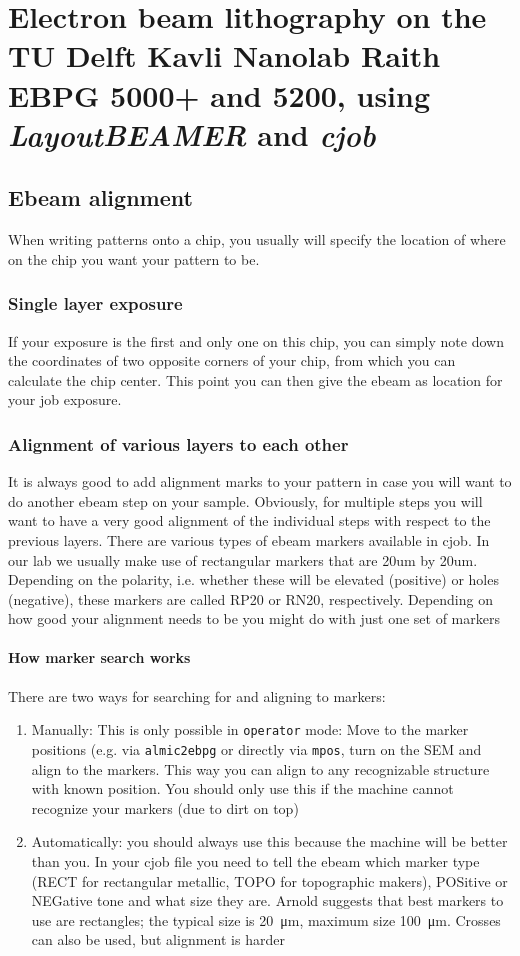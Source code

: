 \chapter{Electron beam lithography on the TU Delft Kavli Nanolab Raith EBPG 5000+ and 5200, using \textit{LayoutBEAMER} and \textit{cjob}}
\label{app:ebeam}
\clearpage
\section{Ebeam alignment}
When writing patterns onto a chip, you usually will specify the location of where on the chip you want your pattern to be.

\subsection{Single layer exposure}
If your exposure is the first and only one on this chip, you can simply note down the coordinates of two opposite corners of your chip, from which you can calculate the chip center. This point you can then give the ebeam as location for your job exposure.

\subsection{Alignment of various layers to each other}
It is always good to add alignment marks to your pattern in case you will want to do another ebeam step on your sample. Obviously, for multiple steps you will want to have a very good alignment of the individual steps with respect to the previous layers. There are various types of ebeam markers available in cjob. In our lab we usually make use of rectangular markers that are 20um by 20um. Depending on the polarity, i.e. whether these will be elevated (positive) or holes (negative), these markers are called RP20 or RN20, respectively.
Depending on how good your alignment needs to be you might do with just one set of markers

\subsubsection{How marker search works}
There are two ways for searching for and aligning to markers:
\begin{enumerate}
	\item Manually: This is only possible in \lstinline|operator| mode: Move to the marker positions (e.g. via \lstinline|almic2ebpg| or directly via \lstinline|mpos|, turn on the SEM and align to the markers. This way you can align to any recognizable structure with known position. You should only use this if the machine cannot recognize your markers (due to dirt on top)
	\item Automatically: you should always use this because the machine will be better than you. In your cjob file you need to tell the ebeam which marker type (RECT for rectangular metallic, TOPO for topographic makers), POSitive or NEGative tone and what size they are. Arnold suggests that best markers to use are rectangles; the typical size is \SI{20}{\micro\meter}, maximum size \SI{100}{\micro\meter}. Crosses can also be used, but alignment is harder
\end{enumerate}

